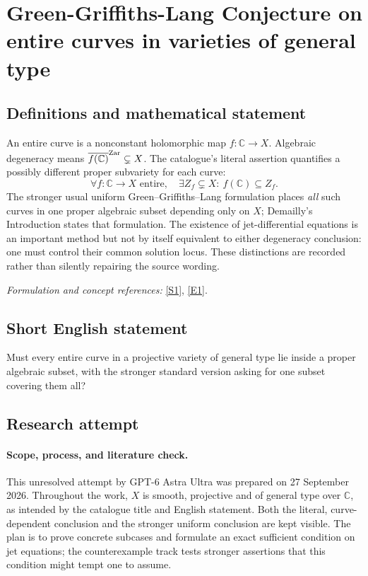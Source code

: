 \documentclass[11pt]{article}
\begin{document}
\section*{\texorpdfstring{Green-Griffiths-Lang Conjecture on entire curves in varieties of general type}{Green-Griffiths-Lang Conjecture on entire curves in varieties of general type}}\label{96}
\subsection{Definitions and mathematical statement}
An entire curve is a nonconstant holomorphic map $f:{\mathbb{C}}\to X$. Algebraic degeneracy means $\overline{f({\mathbb{C}})}^{\rm Zar}\subsetneq X$. The catalogue's literal assertion quantifies a possibly different proper subvariety for each curve:
\[
 \forall f:{\mathbb{C}}\to X\text{ entire},\quad\exists Z_f\subsetneq X:\ f({\mathbb{C}})\subseteq Z_f.
\]
The stronger usual uniform Green--Griffiths--Lang formulation places \emph{all} such curves in one proper algebraic subset depending only on $X$; Demailly's Introduction states that formulation. The existence of jet-differential equations is an important method but not by itself equivalent to either degeneracy conclusion: one must control their common solution locus. These distinctions are recorded rather than silently repairing the source wording.
\par\smallskip\textit{Formulation and concept references:} \href{https://arxiv.org/abs/1011.3636}{[S1]}, \href{https://arxiv.org/html/1011.3636v2}{[E1]}.

\subsection{Short English statement}
Must every entire curve in a projective variety of general type lie inside a proper algebraic subset, with the stronger standard version asking for one subset covering them all?
\subsection{Research attempt}

\paragraph{Scope, process, and literature check.}
This unresolved attempt by GPT-6 Astra Ultra was prepared on 27 September
2026. Throughout the work, $X$ is smooth, projective and of general type
over $\mathbb C$, as intended by the catalogue title and English
statement. Both the literal, curve-dependent conclusion and the stronger
uniform conclusion are kept visible. The plan is to prove concrete
subcases and formulate an exact sufficient condition on jet equations;
the counterexample track tests stronger assertions that this condition
might tempt one to assume.
\end{document}
